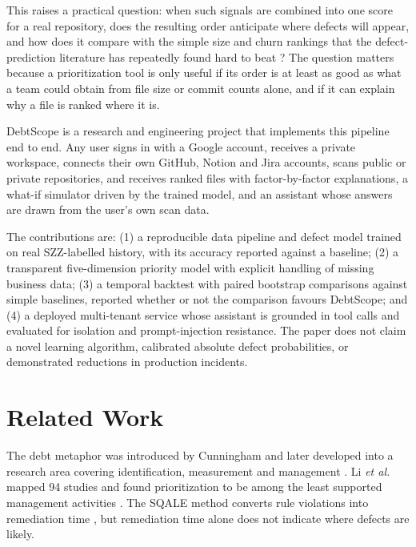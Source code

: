 \documentclass[conference]{IEEEtran}
\begin{document}
This raises a practical question: when such signals are combined into one score for a real repository, does the resulting order anticipate where defects will appear, and how does it compare with the simple size and churn rankings that the defect-prediction literature has repeatedly found hard to beat \cite{nagappan,hall,lessmann}? The question matters because a prioritization tool is only useful if its order is at least as good as what a team could obtain from file size or commit counts alone, and if it can explain why a file is ranked where it is.

DebtScope is a research and engineering project that implements this pipeline end to end. Any user signs in with a Google account, receives a private workspace, connects their own GitHub, Notion and Jira accounts, scans public or private repositories, and receives ranked files with factor-by-factor explanations, a what-if simulator driven by the trained model, and an assistant whose answers are drawn from the user's own scan data.

The contributions are: (1) a reproducible data pipeline and defect model trained on real SZZ-labelled history, with its accuracy reported against a baseline; (2) a transparent five-dimension priority model with explicit handling of missing business data; (3) a temporal backtest with paired bootstrap comparisons against simple baselines, reported whether or not the comparison favours DebtScope; and (4) a deployed multi-tenant service whose assistant is grounded in tool calls and evaluated for isolation and prompt-injection resistance. The paper does not claim a novel learning algorithm, calibrated absolute defect probabilities, or demonstrated reductions in production incidents.

\section{Related Work}
The debt metaphor was introduced by Cunningham \cite{cunningham} and later developed into a research area covering identification, measurement and management \cite{kruchten,li}. Li \textit{et al.} mapped 94 studies and found prioritization to be among the least supported management activities \cite{li}. The SQALE method converts rule violations into remediation time \cite{letouzey}, but remediation time alone does not indicate where defects are likely.
\end{document}
